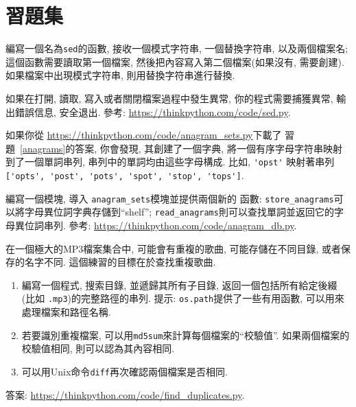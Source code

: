 \documentclass[10pt]{book}
\begin{document}
\section{習題集}

\begin{exercise}

編寫一個名為{\tt sed}的函數, 接收一個模式字符串, 一個替換字符串, 以及兩個檔案名;
這個函數需要讀取第一個檔案, 然後把內容寫入第二個檔案(如果沒有, 需要創建).
如果檔案中出現模式字符串, 則用替換字符串進行替換. 

如果在打開, 讀取, 寫入或者關閉檔案過程中發生異常, 
你的程式需要捕獲異常, 輸出錯誤信息, 安全退出. 
參考: \url{https://thinkpython.com/code/sed.py}.

\end{exercise}


\begin{exercise}

如果你從 \url{https://thinkpython.com/code/anagram_sets.py}下載了
習題~\ref{anagrams}的答案, 你會發現, 
其創建了一個字典, 將一個有序字母字符串映射到了一個單詞串列, 
串列中的單詞均由這些字母構成. 比如,
\verb"'opst'" 映射著串列
\verb"['opts', 'post', 'pots', 'spot', 'stop', 'tops']".

編寫一個模塊, 導入 \verb"anagram_sets"模塊並提供兩個新的
函數: \verb"store_anagrams"可以將字母異位詞字典存儲到``shelf''; 
\verb"read_anagrams"則可以查找單詞並返回它的字母異位詞串列. 
參考: \url{https://thinkpython.com/code/anagram_db.py}.

\end{exercise}


\begin{exercise}
\label{checksum}

在一個極大的MP3檔案集合中, 可能會有重複的歌曲, 可能存儲在不同目錄, 
或者保存的名字不同. 
這個練習的目標在於查找重複歌曲. 

\begin{enumerate}

\item 編寫一個程式, 搜索目錄, 並遞歸其所有子目錄, 
返回一個包括所有給定後綴 (比如 {\tt .mp3})的完整路徑的串列. 
提示: {\tt os.path}提供了一些有用函數, 可以用來處理檔案和路徑名稱. 

\item 若要識別重複檔案, 可以用{\tt md5sum}來計算每個檔案的``校驗值''. 
如果兩個檔案的校驗值相同, 則可以認為其內容相同. 

\item 可以用Unix命令{\tt diff}再次確認兩個檔案是否相同. 

\end{enumerate}

答案: \url{https://thinkpython.com/code/find_duplicates.py}.

\end{exercise}
\end{document}

